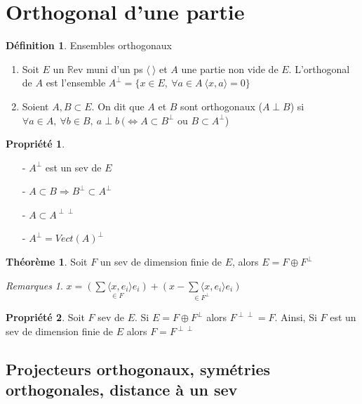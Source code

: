 \documentclass[fleqn]{article}
\theoremstyle{definition} \newtheorem*{defi}{D\'efinition}
\theoremstyle{definition} \newtheorem*{theo}{Th\'eor\`eme}
\theoremstyle{definition} \newtheorem*{coro}{Corollaire}
\theoremstyle{remark} \newtheorem*{rqs}{Remarques}
\theoremstyle{definition} \newtheorem*{prop}{Propri\'et\'e}
\begin{document}
\section{Orthogonal d'une partie}
\begin{defi} Ensembles orthogonaux
	\begin{enumerate}
		\item Soit $E$ un $\mathbb{R}$ev muni d'un ps $\langle\ \rangle$ et $A$ une partie non vide de $E$. L'orthogonal de $A$ est l'ensemble $A^{\perp} =
			\{x \in E,\ \forall a \in A\ \langle x,a \rangle = 0\}$
		\item Soient $A,B \subset E$. On dit que $A$ et $B$ sont orthogonaux ($A \perp B$) si $\forall a \in A,\ \forall b \in B,\ a \perp b
			\ (\Leftrightarrow A \subset B^\perp$ ou $B \subset A^\perp$)
	\end{enumerate}
\end{defi}

\begin{prop} $ $
	\begin{enumerate}
		\item [-] $A^{\perp}$ est un sev de $E$
		\item [-] $A \subset B \Rightarrow B^\perp \subset A^\perp$
		\item [-] $A \subset A^{\perp \perp}$
		\item [-] $A^\perp = Vect(A)^\perp$
	\end{enumerate}
\end{prop}

\begin{theo} Soit $F$ un sev de dimension finie de $E$, alors $E = F \oplus F^\perp$
	\begin{rqs}
		$x = \underset{\in F}{(\sum \langle x,e_i \rangle e_i)} + \underset{\in F^\perp}{(x - \sum \langle x,e_i \rangle e_i)}$
	\end{rqs}
\end{theo}
\begin{prop}
	Soit $F$ sev de $E$. Si $E = F \oplus F^\perp$ alors $F^{\perp \perp} = F$. Ainsi, Si $F$ est un sev de dimension finie de $E$ alors
	$F = F^{\perp \perp}$
\end{prop}

\subsection{Projecteurs orthogonaux, sym\'etries orthogonales, distance \`a un sev}
\end{document}
